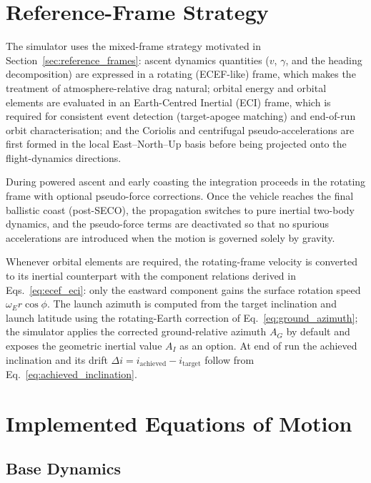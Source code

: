 \section{Reference-Frame Strategy}
\label{sec:sim_frames}

The simulator uses the mixed-frame strategy motivated in
Section~\ref{sec:reference_frames}: ascent dynamics quantities ($v$, $\gamma$,
and the heading decomposition) are expressed in a rotating (ECEF-like) frame,
which makes the treatment of atmosphere-relative drag natural; orbital energy and
orbital elements are evaluated in an Earth-Centred Inertial (ECI) frame, which is
required for consistent event detection (target-apogee matching) and end-of-run
orbit characterisation; and the Coriolis and centrifugal pseudo-accelerations are
first formed in the local East--North--Up basis before being projected onto the
flight-dynamics directions.

During powered ascent and early coasting the integration proceeds in the rotating
frame with optional pseudo-force corrections. Once the vehicle reaches the final
ballistic coast (post-SECO), the propagation switches to pure inertial two-body
dynamics, and the pseudo-force terms are deactivated so that no spurious
accelerations are introduced when the motion is governed solely by gravity.

Whenever orbital elements are required, the rotating-frame velocity is converted
to its inertial counterpart with the component relations derived in
Eqs.~\eqref{eq:ecef_eci}: only the eastward component gains the surface rotation
speed $\omega_E r\cos\phi$. The launch azimuth is computed from the target
inclination and launch latitude using the rotating-Earth correction of
Eq.~\eqref{eq:ground_azimuth}; the simulator applies the corrected ground-relative
azimuth $A_G$ by default and exposes the geometric inertial value $A_I$ as an
option. At end of run the achieved inclination and its drift
$\Delta i = i_{\mathrm{achieved}} - i_{\mathrm{target}}$ follow from
Eq.~\eqref{eq:achieved_inclination}.

\section{Implemented Equations of Motion}
\label{sec:eom}

\subsection{Base Dynamics}
\label{ssec:base_eom}

